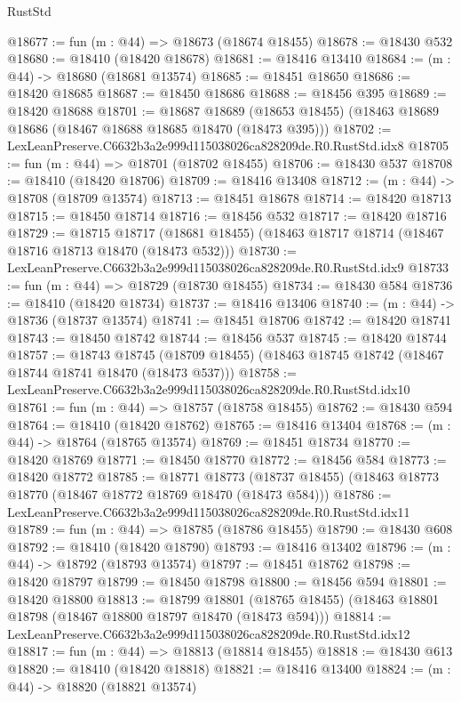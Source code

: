 \begin{lexlean}{RustStd}
\begin{coremodule}
@18677 := fun (m : @44) => @18673 (@18674 @18455)
@18678 := @18430 @532
@18680 := @18410 (@18420 @18678)
@18681 := @18416 @13410
@18684 := (m : @44) -> @18680 (@18681 @13574)
@18685 := @18451 @18650
@18686 := @18420 @18685
@18687 := @18450 @18686
@18688 := @18456 @395
@18689 := @18420 @18688
@18701 := @18687
    @18689
    (@18653 @18455)
    (@18463 @18689 @18686 (@18467 @18688 @18685 @18470 (@18473 @395)))
@18702 := LexLeanPreserve.C6632b3a2e999d115038026ca828209de.R0.RustStd.idx8
@18705 := fun (m : @44) => @18701 (@18702 @18455)
@18706 := @18430 @537
@18708 := @18410 (@18420 @18706)
@18709 := @18416 @13408
@18712 := (m : @44) -> @18708 (@18709 @13574)
@18713 := @18451 @18678
@18714 := @18420 @18713
@18715 := @18450 @18714
@18716 := @18456 @532
@18717 := @18420 @18716
@18729 := @18715
    @18717
    (@18681 @18455)
    (@18463 @18717 @18714 (@18467 @18716 @18713 @18470 (@18473 @532)))
@18730 := LexLeanPreserve.C6632b3a2e999d115038026ca828209de.R0.RustStd.idx9
@18733 := fun (m : @44) => @18729 (@18730 @18455)
@18734 := @18430 @584
@18736 := @18410 (@18420 @18734)
@18737 := @18416 @13406
@18740 := (m : @44) -> @18736 (@18737 @13574)
@18741 := @18451 @18706
@18742 := @18420 @18741
@18743 := @18450 @18742
@18744 := @18456 @537
@18745 := @18420 @18744
@18757 := @18743
    @18745
    (@18709 @18455)
    (@18463 @18745 @18742 (@18467 @18744 @18741 @18470 (@18473 @537)))
@18758 := LexLeanPreserve.C6632b3a2e999d115038026ca828209de.R0.RustStd.idx10
@18761 := fun (m : @44) => @18757 (@18758 @18455)
@18762 := @18430 @594
@18764 := @18410 (@18420 @18762)
@18765 := @18416 @13404
@18768 := (m : @44) -> @18764 (@18765 @13574)
@18769 := @18451 @18734
@18770 := @18420 @18769
@18771 := @18450 @18770
@18772 := @18456 @584
@18773 := @18420 @18772
@18785 := @18771
    @18773
    (@18737 @18455)
    (@18463 @18773 @18770 (@18467 @18772 @18769 @18470 (@18473 @584)))
@18786 := LexLeanPreserve.C6632b3a2e999d115038026ca828209de.R0.RustStd.idx11
@18789 := fun (m : @44) => @18785 (@18786 @18455)
@18790 := @18430 @608
@18792 := @18410 (@18420 @18790)
@18793 := @18416 @13402
@18796 := (m : @44) -> @18792 (@18793 @13574)
@18797 := @18451 @18762
@18798 := @18420 @18797
@18799 := @18450 @18798
@18800 := @18456 @594
@18801 := @18420 @18800
@18813 := @18799
    @18801
    (@18765 @18455)
    (@18463 @18801 @18798 (@18467 @18800 @18797 @18470 (@18473 @594)))
@18814 := LexLeanPreserve.C6632b3a2e999d115038026ca828209de.R0.RustStd.idx12
@18817 := fun (m : @44) => @18813 (@18814 @18455)
@18818 := @18430 @613
@18820 := @18410 (@18420 @18818)
@18821 := @18416 @13400
@18824 := (m : @44) -> @18820 (@18821 @13574)

\end{coremodule}
\end{lexlean}
